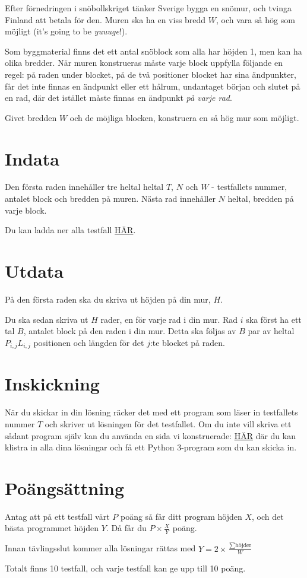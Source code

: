 Efter förnedringen i snöbollskriget tänker Sverige bygga en snömur, och tvinga Finland att betala för den.
Muren ska ha en viss bredd $W$, och vara så hög som möjligt (it's going to be \emph{yuuuge}!).

Som byggmaterial finns det ett antal snöblock som alla har höjden 1, men kan ha olika bredder.
När muren konstrueras måste varje block uppfylla följande en regel: på raden under blocket,
på de två positioner blocket har sina ändpunkter, får det inte finnas en ändpunkt eller ett hålrum,
undantaget början och slutet på en rad, där det istället måste finnas en ändpunkt \emph{på varje rad}.

Givet bredden $W$ och de möjliga blocken, konstruera en så hög mur som möjligt.

\section*{Indata}
Den första raden innehåller tre heltal heltal $T$, $N$ och $W$ - testfallets nummer, antalet block och bredden på muren.
Nästa rad innehåller $N$ heltal, bredden på varje block.

Du kan ladda ner alla testfall \url{HÄR}.

\section*{Utdata}
På den första raden ska du skriva ut höjden på din mur, $H$.

Du ska sedan skriva ut $H$ rader, en för varje rad i din mur.
Rad $i$ ska först ha ett tal $B$, antalet block på den raden i din mur.
Detta ska följas av $B$ par av heltal $P_{i,j} L_{i,j}$ positionen och längden för det $j$:te blocket på raden.

\section*{Inskickning}
När du skickar in din lösning räcker det med ett program som läser in testfallets nummer $T$ och skriver ut lösningen för det testfallet.
Om du inte vill skriva ett sådant program själv kan du använda en sida vi konstruerade: \url{HÄR} där du kan klistra in
alla dina lösningar och få ett Python 3-program som du kan skicka in.

\section*{Poängsättning}
Antag att på ett testfall värt $P$ poäng så får ditt program höjden $X$, och det bästa programmet höjden $Y$. Då får du $P \times \frac{X}{Y}$ poäng.

Innan tävlingsslut kommer alla lösningar rättas med $Y = 2 \times \frac{\sum{\text{höjder}}}{W}$

Totalt finns 10 testfall, och varje testfall kan ge upp till 10 poäng.

